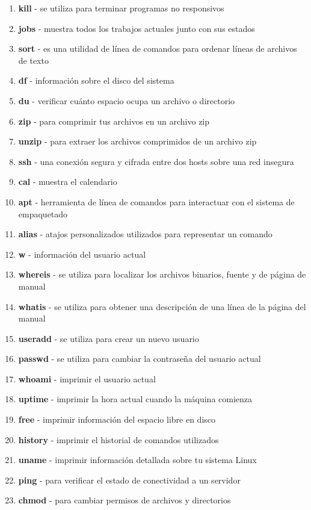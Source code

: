 \begin{enumerate}
\item \textbf{kill} - se utiliza para terminar programas no responsivos
\item \textbf{jobs} - muestra todos los trabajos actuales junto con sus estados
\item \textbf{sort} - es una utilidad de línea de comandos para ordenar líneas de archivos de texto
\item \textbf{df} - información sobre el disco del sistema
\item \textbf{du} - verificar cuánto espacio ocupa un archivo o directorio
\item \textbf{zip} - para comprimir tus archivos en un archivo zip
\item \textbf{unzip} - para extraer los archivos comprimidos de un archivo zip
\item \textbf{ssh} - una conexión segura y cifrada entre dos hosts sobre una red insegura
\item \textbf{cal} - muestra el calendario
\item \textbf{apt} - herramienta de línea de comandos para interactuar con el sistema de empaquetado
\item \textbf{alias} - atajos personalizados utilizados para representar un comando
\item \textbf{w} - información del usuario actual
\item \textbf{whereis} - se utiliza para localizar los archivos binarios, fuente y de página de manual
\item \textbf{whatis} - se utiliza para obtener una descripción de una línea de la página del manual
\item \textbf{useradd} - se utiliza para crear un nuevo usuario
\item \textbf{passwd} - se utiliza para cambiar la contraseña del usuario actual
\item \textbf{whoami} - imprimir el usuario actual
\item \textbf{uptime} - imprimir la hora actual cuando la máquina comienza
\item \textbf{free} - imprimir información del espacio libre en disco
\item \textbf{history} - imprimir el historial de comandos utilizados
\item \textbf{uname} - imprimir información detallada sobre tu sistema Linux
\item \textbf{ping} - para verificar el estado de conectividad a un servidor
\item \textbf{chmod} - para cambiar permisos de archivos y directorios

\end{enumerate}
